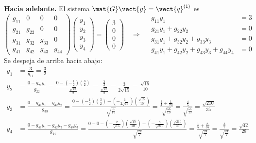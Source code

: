 \textbf{Hacia adelante.} El sistema $\mat{G}\vect{y} = \vect{q}^{(1)}$ es
\[
\begin{pmatrix}
	g_{11} & 0 & 0 & 0\\
	g_{21} & g_{22} & 0 & 0\\
	g_{31} & g_{32} & g_{33} & 0\\
	g_{41} & g_{42} & g_{43} & g_{44}
\end{pmatrix}
\begin{pmatrix} y_1\\ y_2\\ y_3\\ y_4 \end{pmatrix}
=
\begin{pmatrix} 3\\ 0\\ 0\\ 0 \end{pmatrix}
\quad\Longrightarrow\quad
\begin{aligned}
	g_{11}y_1 &= 3\\
	g_{21}y_1 + g_{22}y_2 &= 0\\
	g_{31}y_1 + g_{32}y_2 + g_{33}y_3 &= 0\\
	g_{41}y_1 + g_{42}y_2 + g_{43}y_3 + g_{44}y_4 &= 0
\end{aligned}
\]
Se despeja de arriba hacia abajo:
\begin{align*}
	y_1 &= \frac{3}{g_{11}} = \frac32\\[8pt]
	y_2 &= \frac{0 - g_{21}y_1}{g_{22}}
	= \frac{0 - \left(-\tfrac12\right)\left(\tfrac32\right)}{\tfrac{\sqrt{15}}{2}}
	= \frac{\tfrac34}{\tfrac{\sqrt{15}}{2}} = \frac{3}{2\sqrt{15}} = \frac{\sqrt{15}}{10}\\[8pt]
	y_3 &= \frac{0 - g_{31}y_1 - g_{32}y_2}{g_{33}}
	= \frac{0 - \left(-\tfrac12\right)\left(\tfrac32\right) - \left(-\tfrac{1}{2\sqrt{15}}\right)\left(\tfrac{\sqrt{15}}{10}\right)}{\sqrt{\tfrac{56}{15}}}
	= \frac{\tfrac34 + \tfrac{1}{20}}{\sqrt{\tfrac{56}{15}}}
	= \frac{\tfrac45}{\sqrt{\tfrac{56}{15}}} = \frac{\sqrt{210}}{35}\\[8pt]
	y_4 &= \frac{0 - g_{41}y_1 - g_{42}y_2 - g_{43}y_3}{g_{44}}
	= \frac{0 - 0 - \left(-\tfrac{2}{\sqrt{15}}\right)\left(\tfrac{\sqrt{15}}{10}\right) - \left(-\tfrac{8}{\sqrt{210}}\right)\left(\tfrac{\sqrt{210}}{35}\right)}{\sqrt{\tfrac{24}{7}}}
	= \frac{\tfrac15 + \tfrac{8}{35}}{\sqrt{\tfrac{24}{7}}}
	= \frac{\tfrac37}{\sqrt{\tfrac{24}{7}}} = \frac{\sqrt{42}}{28}
\end{align*}

